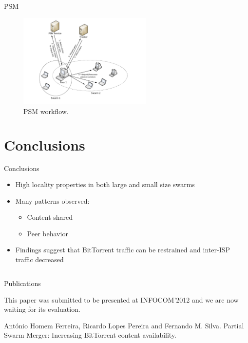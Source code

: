 \documentclass{beamer}
\begin{document}
\begin{frame}{PSM}

\begin{figure}[h]
\includegraphics[height=1.85in]{figures/PSM-Workflow2}
\caption{PSM workflow.}
\label{ctrep:2} 
\end{figure}

\end{frame}

\section{Conclusions}

\begin{frame}{Conclusions}

\begin{itemize}

\addtolength{\itemsep}{1\baselineskip}
\item
    High locality properties in both large and small size swarms
\item
    Many patterns observed:
\begin{itemize}
\addtolength{\itemsep}{1\baselineskip}
\item
   Content shared
\item
   Peer behavior
\end{itemize}

\item
   Findings suggest that BitTorrent traffic can be restrained and inter-ISP traffic decreased

\end{itemize}

\end{frame}

\subsection*{}

\begin{frame}{Publications}
  
This paper was submitted to be presented at INFOCOM'2012 and we are now waiting for its evaluation.
\begin{list}{*}{}
\item António Homem Ferreira, Ricardo Lopes Pereira and Fernando M. Silva. Partial Swarm Merger: Increasing BitTorrent content availability.
\end{list}

\end{frame}
\end{document}
